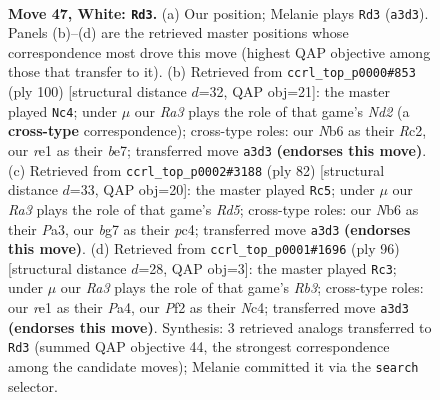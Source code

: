 \documentclass[11pt]{article}
\begin{document}
\clearpage

\begin{figure}[p]\centering
\begin{subfigure}{0.46\textwidth}\centering
\resizebox{\linewidth}{!}{%
\newchessgame
\chessboard[
  setfen={8/1p4bk/1N4p1/5p1p/P7/R4KPP/2r2P2/4r3 w - - 9 47},
  showmover=false,
  pgfstyle=straightmove, color=movearrow, markmove={a3-d3}
]}
\caption{}
\end{subfigure}\hfill
\begin{subfigure}{0.46\textwidth}\centering
\resizebox{\linewidth}{!}{%
\newchessgame
\chessboard[
  setfen={8/4bpk1/4p1p1/8/3PKP2/r3P3/2RN4/8 w - - 1 51},
  showmover=false,
  pgfstyle=straightmove, color=movearrow, markmove={d2-c4}
]}
\caption{}
\end{subfigure}
\\[4pt]
\begin{subfigure}{0.46\textwidth}\centering
\resizebox{\linewidth}{!}{%
\newchessgame
\chessboard[
  setfen={8/4kpp1/7p/3R1P1P/p1p5/P3PK2/1r3P2/8 w - - 0 42},
  showmover=false,
  pgfstyle=straightmove, color=movearrow, markmove={d5-c5}
]}
\caption{}
\end{subfigure}\hfill
\begin{subfigure}{0.46\textwidth}\centering
\resizebox{\linewidth}{!}{%
\newchessgame
\chessboard[
  setfen={2n5/2k3p1/5p1p/5p2/P1Nr4/1R3KP1/1P5P/8 w - - 1 49},
  showmover=false,
  pgfstyle=straightmove, color=movearrow, markmove={b3-c3}
]}
\caption{}
\end{subfigure}
\caption{\textbf{Move 47, White: \texttt{Rd3}.} (a) Our position; Melanie plays \texttt{Rd3} (\texttt{a3d3}). Panels (b)--(d) are the retrieved master positions whose correspondence most drove this move (highest QAP objective among those that transfer to it). (b) Retrieved from \texttt{ccrl\_top\_p0000\#853} (ply 100) [structural distance $d$=32, QAP obj=21]: the master played \texttt{Nc4}; under $\mu$ our \emph{Ra3} plays the role of that game's \emph{Nd2} (a \textbf{cross-type} correspondence); cross-type roles: our \emph{N}b6 as their \emph{R}c2, our \emph{r}e1 as their \emph{b}e7; transferred move \texttt{a3d3} \textbf{(endorses this move)}. (c) Retrieved from \texttt{ccrl\_top\_p0002\#3188} (ply 82) [structural distance $d$=33, QAP obj=20]: the master played \texttt{Rc5}; under $\mu$ our \emph{Ra3} plays the role of that game's \emph{Rd5}; cross-type roles: our \emph{N}b6 as their \emph{P}a3, our \emph{b}g7 as their \emph{p}c4; transferred move \texttt{a3d3} \textbf{(endorses this move)}. (d) Retrieved from \texttt{ccrl\_top\_p0001\#1696} (ply 96) [structural distance $d$=28, QAP obj=3]: the master played \texttt{Rc3}; under $\mu$ our \emph{Ra3} plays the role of that game's \emph{Rb3}; cross-type roles: our \emph{r}e1 as their \emph{P}a4, our \emph{P}f2 as their \emph{N}c4; transferred move \texttt{a3d3} \textbf{(endorses this move)}. Synthesis: 3 retrieved analogs transferred to \texttt{Rd3} (summed QAP objective 44, the strongest correspondence among the candidate moves); Melanie committed it via the \texttt{search} selector.}
\label{fig:thought-m92}
\end{figure}
\end{document}
